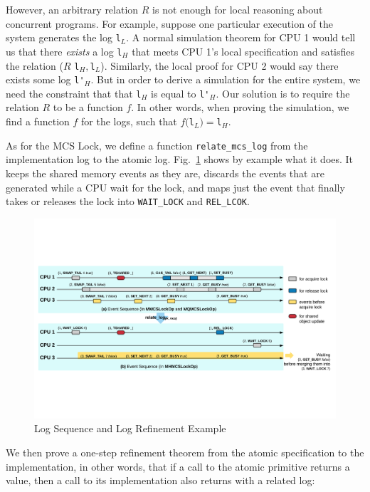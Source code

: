 However, an arbitrary relation $R$ is not enough for local reasoning
about concurrent programs.  For example, suppose one particular
execution of the system generates the log \lstinline$l$$_L$.  A normal simulation
theorem for CPU 1 would tell us that there \emph{exists} a log \lstinline$l$$_H$
that meets CPU 1's local specification and satisfies the relation
($R$ \lstinline$l$$_H,$\lstinline$l$$_L$). Similarly, the local proof for CPU 2 would say there
exists some log \lstinline$l'$$_H$. But in order to derive a simulation for the
entire system, we need the constraint that that \lstinline$l$$_H$ is equal to
\lstinline$l'$$_H$. Our solution is to require the relation $R$ to be a function $f$. 
In other words, when proving the simulation,
we find a function $f$ for the logs, such that $f($\lstinline$l$$_L) = $\lstinline$l$$_H$.


As for the MCS Lock, we define a function \lstinline$relate_mcs_log$ from the
implementation log to the atomic log. Fig.~\ref{fig:logsequence}
shows by example what it does. It keeps the shared memory events as
they are, discards the events that are generated while a CPU wait for
the lock, and maps just the event that finally takes or releases the
lock into \lstinline$WAIT_LOCK$ and \lstinline$REL_LCOK$.
\begin{figure}
\includegraphics[width=\textwidth]{figs/mcslock/logsequence}
\caption{Log Sequence and Log Refinement Example}
\label{fig:logsequence}
\end{figure}

We then prove a one-step refinement theorem from the atomic specification 
to the implementation, in other words, that if a call to the atomic primitive returns a 
value, then a call to its implementation also returns with a related log:


